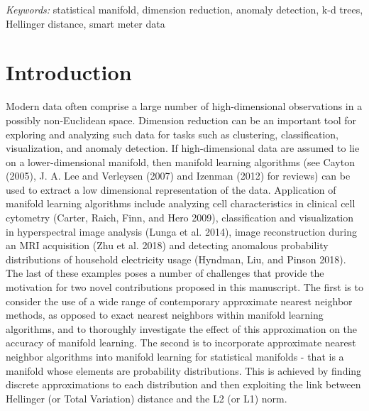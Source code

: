\documentclass[12pt]{article}
\begin{document}
\noindent%
{\it Keywords:} statistical manifold, dimension reduction, anomaly detection, k-d trees, Hellinger distance, smart meter data
\vfill

\newpage
{} %

\newpage

\hypertarget{introduction}{%
\section{Introduction}\label{introduction}}

Modern data often comprise a large number of high-dimensional observations in a possibly non-Euclidean space. Dimension reduction can be an important tool for exploring and analyzing such data for tasks such as clustering, classification, visualization, and anomaly detection. If high-dimensional data are assumed to lie on a lower-dimensional manifold, then
manifold learning algorithms (see Cayton (2005), J. A. Lee and Verleysen (2007) and Izenman (2012) for reviews) can be used to extract a low dimensional representation of the data. Application of manifold learning algorithms include analyzing cell characteristics in clinical cell cytometry (Carter, Raich, Finn, and Hero 2009), classification and visualization in hyperspectral image analysis (Lunga et al. 2014), image reconstruction during an MRI acquisition (Zhu et al. 2018) and detecting anomalous probability distributions of household electricity usage (Hyndman, Liu, and Pinson 2018). The last of these examples poses a number of challenges that provide the motivation for two novel contributions proposed in this manuscript. The first is to consider the use of a wide range of contemporary approximate nearest neighbor methods, as opposed to exact nearest neighbors within manifold learning algorithms, and to thoroughly investigate the effect of this approximation on the accuracy of manifold learning. The second is to incorporate approximate nearest neighbor algorithms into manifold learning for statistical manifolds - that is a manifold whose elements are probability distributions. This is achieved by finding discrete approximations to each distribution and then exploiting the link between Hellinger (or Total Variation) distance and the L2 (or L1) norm.
\end{document}
